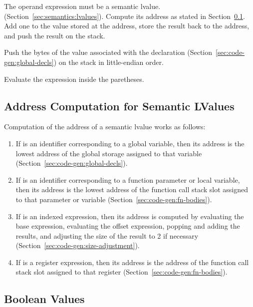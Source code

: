 \documentclass[10pt]{article}
\begin{document}
 The
operand expression must be a semantic
lvalue. (Section~\ref{sec:semantics:lvalues}).  Compute its address as
stated in Section~\ref{sec:code-gen:lvalues}.  Add one to the value
stored at the address, store the result back to the address, and push
the result on the stack.

 Push the bytes of the value associated
with the declaration (Section~\ref{sec:code-gen:global-decls}) on the
stack in little-endian order.

 Evaluate the expression inside the
paretheses.

\subsection{Address Computation for Semantic LValues}
\label{sec:code-gen:lvalues}

Computation of the address of a semantic lvalue  works
as follows:
%
\begin{enumerate}
%
\item If  is an identifier corresponding to a global
  variable, then its address is the lowest address of the global
  storage assigned to that variable
  (Section~\ref{sec:code-gen:global-decls}). 
%
\item If  is an identifier corresponding to a function
  parameter or local variable, then its address is the lowest address
  of the function call stack slot assigned to that parameter or
  variable (Section~\ref{sec:code-gen:fn-bodies}).
%
\item If  is an indexed expression, then its address is
  computed by evaluating the base expression, evaluating the offset
  expression, popping and adding the results, and adjusting the size
  of the result to 2 if necessary
  (Section~\ref{sec:code-gen:size-adjustment}). 
%
\item If  is a register expression, then its address is
  the address of the function call stack slot assigned to that
  register (Section~\ref{sec:code-gen:fn-bodies}).
%
\end{enumerate}

\subsection{Boolean Values}
\label{sec:code-gen:boolean}
\end{document}
